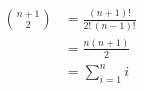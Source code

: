 \begin{align*}
    \binom{n+1}{2} &= \frac{(n+1)!}{2!\,(n-1)!} \\
    &= \frac{n(n+1)}{2} \\
    &= \sum_{i=1}^ni \tag{by equation (A.1)}
\end{align*}

